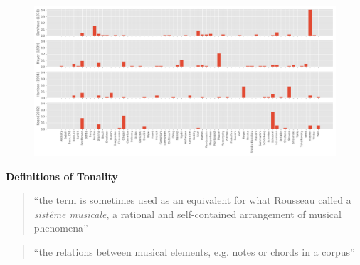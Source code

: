 \begin{frame}{\insertsectionhead}
  \begin{figure}
    \includegraphics[width=.9\textwidth]{img/composer_counts.pdf}
  \end{figure}
\end{frame}



\begin{frame}{\insertsectionhead}
  	\textbf{Definitions of Tonality}

   \begin{quote}
     ``the term is sometimes used as an equivalent for what Rousseau called
     a \emph{sistême musicale}, a rational and self-contained arrangement of musical phenomena''\\
     \emph{\hfill\parencite{Hyer2001}}
  \end{quote}
  \vspace{1em}
  \pause
  \begin{quote}
    ``the relations between musical elements, e.g. notes or chords in a corpus''\\
    \emph{\hfill\parencite{Moss2019a}}
   \end{quote}
\end{frame}

